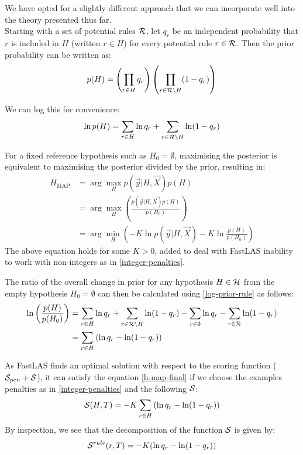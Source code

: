 We have opted for a slightly different approach that we can incorporate well into the theory presented thus far. \\
Starting with a set of potential rules $\mathcal{R}$, let $q_r$ be an independent probability that $r$ is included in $H$ (written $r \in H$) for every potential rule $r \in \mathcal{R}$. Then the prior probability can be written as:
\begin{align}
p(H) = \left(\prod_{r \in H} q_r\right)\left(\prod_{r \in \mathcal{R}\setminus H} (1-q_r)\right)
\end{align}

We can log this for convenience:
\begin{align}
\ln p(H) = \sum_{r \in H} \ln q_r + \sum_{r \in \mathcal{R}\setminus H} \ln(1-q_r) \label{log-prior-rule}
\end{align}


For a fixed reference hypothesis such as $H_0 = \emptyset$, maximising the posterior is equivalent to maximising the posterior divided by the prior, resulting in:
\begin{align}
H_{\text{MAP}}
& = \arg\max_{H} p(\vec{y}|H, \vec{X}) p(H)  \nonumber \\
& = \arg\max_{H} \left(\frac{ p(\vec{y}|H, \vec{X}) p(H)}{p(H_0)}\right)  \nonumber \\
& = \arg\min_{H} \left( -K\ln p(\vec{y}|H, \vec{X}) - K \ln \frac{p(H)}{p(H_0)}\right) \label{h-map-final}
\end{align}
The above equation holds for some $K > 0$, added to deal with FastLAS inability to work with non-integers as in \ref{integer-penalties}.

The ratio of the overall change in prior for any hypothesis $H \in \mathcal{H}$ from the empty hypothesis $H_0 = \emptyset$ can then be calculated using \ref{log-prior-rule} as follows:
\begin{align}
\ln \left(\frac{p(H)}{p(H_0)}\right) 
& = \sum_{r \in H} \ln q_r + \sum_{r \in \mathcal{R}\setminus H} \ln(1-q_r) \nonumber
- \sum_{r \in \emptyset} \ln q_r - \sum_{r \in \mathcal{R}} \ln(1-q_r) \\
& = \sum_{r \in H} \left(\ln q_r - \ln(1-q_r) \right)
\end{align}

As FastLAS finds an optimal solution with respect to the scoring function ($\mathcal{S}_{pen} + \mathcal{S}$), it can satisfy the equation \ref{h-map-final} if we choose the examples penalties as in \ref{integer-penalties} and the following $\mathcal{S}$:
\begin{align}
    \mathcal{S}(H, T) =  -K \sum_{r \in H} \left(\ln q_r - \ln(1-q_r) \right)
\end{align}
By inspection, we see that the decomposition of the function $\mathcal{S}$ is given by:
\begin{align}
    \mathcal{S}^{rule}(r, T) = -K (\ln q_r - \ln(1-q_r))
\end{align}



